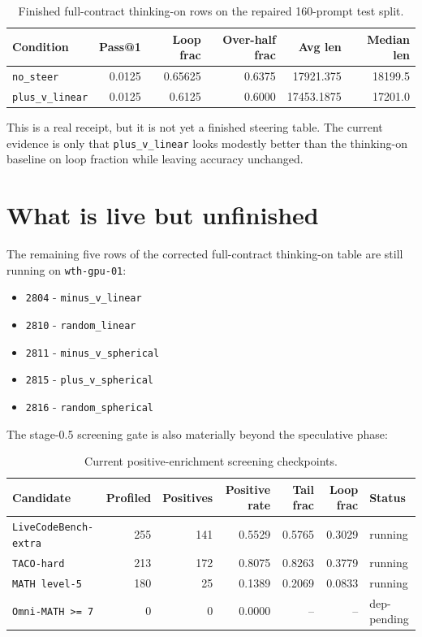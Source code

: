 \documentclass[11pt]{article}
\begin{document}
\begin{table}[h]
\centering
\begin{tabularx}{\textwidth}{>{\raggedright\arraybackslash}p{}rrrrr}
\toprule
Condition & Pass@1 & Loop frac & Over-half frac & Avg len & Median len \\
\midrule
\texttt{no\_steer} & 0.0125 & 0.65625 & 0.6375 & 17921.375 & 18199.5 \\
\texttt{plus\_v\_linear} & 0.0125 & 0.6125 & 0.6000 & 17453.1875 & 17201.0 \\
\bottomrule
\end{tabularx}
\caption{Finished full-contract thinking-on rows on the repaired 160-prompt test split.}
\end{table}

This is a real receipt, but it is not yet a finished steering table. The current evidence is only that \texttt{plus\_v\_linear} looks modestly better than the thinking-on baseline on loop fraction while leaving accuracy unchanged.

\section*{What is live but unfinished}
The remaining five rows of the corrected full-contract thinking-on table are still running on \texttt{wth-gpu-01}:
\begin{itemize}
\item \texttt{2804} - \texttt{minus\_v\_linear}
\item \texttt{2810} - \texttt{random\_linear}
\item \texttt{2811} - \texttt{minus\_v\_spherical}
\item \texttt{2815} - \texttt{plus\_v\_spherical}
\item \texttt{2816} - \texttt{random\_spherical}
\end{itemize}

The stage-0.5 screening gate is also materially beyond the speculative phase:

\begin{table}[h]
\centering
\begin{tabularx}{\textwidth}{>{\raggedright\arraybackslash}p{}rrrrr>{\raggedright\arraybackslash}p{}}
\toprule
Candidate & Profiled & Positives & Positive rate & Tail frac & Loop frac & Status \\
\midrule
\texttt{LiveCodeBench-extra} & 255 & 141 & 0.5529 & 0.5765 & 0.3029 & running \\
\texttt{TACO-hard} & 213 & 172 & 0.8075 & 0.8263 & 0.3779 & running \\
\texttt{MATH level-5} & 180 & 25 & 0.1389 & 0.2069 & 0.0833 & running \\
\texttt{Omni-MATH >= 7} & 0 & 0 & 0.0000 & -- & -- & dep-pending \\
\bottomrule
\end{tabularx}
\caption{Current positive-enrichment screening checkpoints.}
\end{table}
\end{document}
